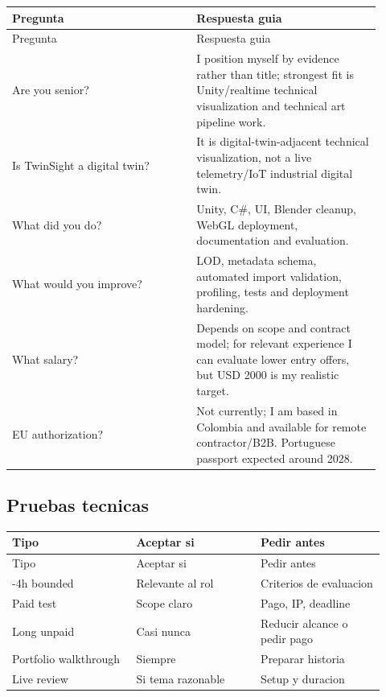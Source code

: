 \begin{center}
\scriptsize
\begin{longtable}{>{\raggedright\arraybackslash}p{0.455\linewidth} >{\raggedright\arraybackslash}p{0.455\linewidth}}
\toprule
Pregunta & Respuesta guia \\
\midrule
\endfirsthead
\toprule
Pregunta & Respuesta guia \\
\midrule
\endhead
Are you senior? & I position myself by evidence rather than title; strongest fit is Unity/realtime technical visualization and technical art pipeline work. \\
Is TwinSight a digital twin? & It is digital-twin-adjacent technical visualization, not a live telemetry/IoT industrial digital twin. \\
What did you do? & Unity, C\#, UI, Blender cleanup, WebGL deployment, documentation and evaluation. \\
What would you improve? & LOD, metadata schema, automated import validation, profiling, tests and deployment hardening. \\
What salary? & Depends on scope and contract model; for relevant experience I can evaluate lower entry offers, but USD 2000 is my realistic target. \\
EU authorization? & Not currently; I am based in Colombia and available for remote contractor/B2B. Portuguese passport expected around 2028. \\
\bottomrule
\end{longtable}
\end{center}



\subsection{Pruebas tecnicas}


\begin{center}
\scriptsize
\begin{longtable}{>{\raggedright\arraybackslash}p{0.305\linewidth} >{\raggedright\arraybackslash}p{0.305\linewidth} >{\raggedright\arraybackslash}p{0.305\linewidth}}
\toprule
Tipo & Aceptar si & Pedir antes \\
\midrule
\endfirsthead
\toprule
Tipo & Aceptar si & Pedir antes \\
\midrule
\endhead
2-4h bounded & Relevante al rol & Criterios de evaluacion \\
Paid test & Scope claro & Pago, IP, deadline \\
Long unpaid & Casi nunca & Reducir alcance o pedir pago \\
Portfolio walkthrough & Siempre & Preparar historia \\
Live review & Si tema razonable & Setup y duracion \\
\bottomrule
\end{longtable}
\end{center}



